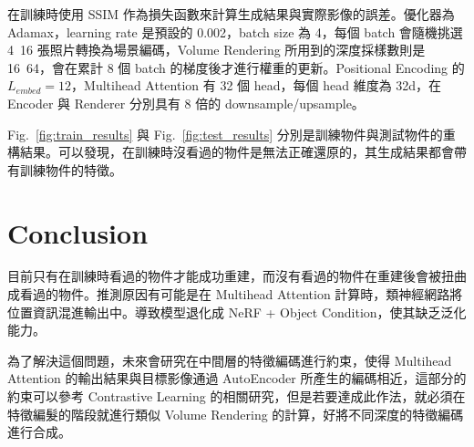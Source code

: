 \documentclass[10pt,twocolumn,letterpaper]{article}
\begin{document}
\begin{CJK}{UTF8}{bkai}
   在訓練時使用 SSIM\cite{SSIM} 作為損失函數來計算生成結果與實際影像的誤差。優化器為 Adamax，learning rate 是預設的 0.002，batch size 為 4，每個 batch 會隨機挑選 4~16
   張照片轉換為場景編碼，Volume Rendering 所用到的深度採樣數則是 16~64，會在累計 8 個 batch 的梯度後才進行權重的更新。Positional Encoding 的
   $L_{embed}=12$，Multihead Attention 有 32 個 head，每個 head 維度為 32d，在 Encoder 與 Renderer 分別具有 8 倍的 downsample/upsample。

   Fig.~\ref{fig:train_results} 與 Fig.~\ref{fig:test_results}
   分別是訓練物件與測試物件的重構結果。可以發現，在訓練時沒看過的物件是無法正確還原的，其生成結果都會帶有訓練物件的特徵。

   \section{Conclusion}
   目前只有在訓練時看過的物件才能成功重建，而沒有看過的物件在重建後會被扭曲成看過的物件。推測原因有可能是在
   Multihead Attention 計算時，類神經網路將位置資訊混進輸出中。導致模型退化成 NeRF + Object Condition，使其缺乏泛化能力。

   為了解決這個問題，未來會研究在中間層的特徵編碼進行約束，使得 Multihead Attention 的輸出結果與目標影像通過 AutoEncoder
   所產生的編碼相近，這部分的約束可以參考 Contrastive Learning 的相關研究，但是若要達成此作法，就必須在特徵編髮的階段就進行類似
   Volume Rendering 的計算，好將不同深度的特徵編碼進行合成。

   {\small
   
   
   }



\end{CJK}
\end{document}

